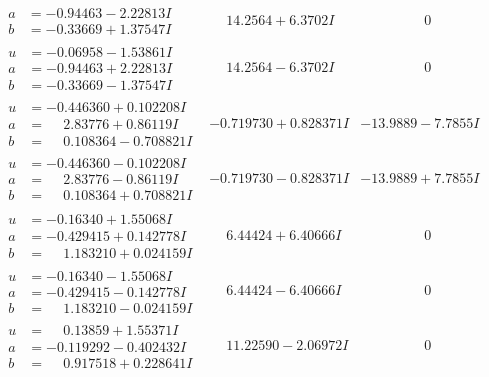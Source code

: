 \documentclass[1p]{elsarticle_modified}
\theoremstyle{definition}
\begin{document}
$$\begin{array}{c|c|c}
\begin{aligned}
a &= -0.94463 - 2.22813 I \\
b &= -0.33669 + 1.37547 I\end{aligned}
 & \phantom{-}14.2564 + 6.3702 I & \phantom{-0.000000 } 0 \\ \hline\begin{aligned}
u &= -0.06958 - 1.53861 I \\
a &= -0.94463 + 2.22813 I \\
b &= -0.33669 - 1.37547 I\end{aligned}
 & \phantom{-}14.2564 - 6.3702 I & \phantom{-0.000000 } 0 \\ \hline\begin{aligned}
u &= -0.446360 + 0.102208 I \\
a &= \phantom{-}2.83776 + 0.86119 I \\
b &= \phantom{-}0.108364 - 0.708821 I\end{aligned}
 & -0.719730 + 0.828371 I & -13.9889 - 7.7855 I \\ \hline\begin{aligned}
u &= -0.446360 - 0.102208 I \\
a &= \phantom{-}2.83776 - 0.86119 I \\
b &= \phantom{-}0.108364 + 0.708821 I\end{aligned}
 & -0.719730 - 0.828371 I & -13.9889 + 7.7855 I \\ \hline\begin{aligned}
u &= -0.16340 + 1.55068 I \\
a &= -0.429415 + 0.142778 I \\
b &= \phantom{-}1.183210 + 0.024159 I\end{aligned}
 & \phantom{-}6.44424 + 6.40666 I & \phantom{-0.000000 } 0 \\ \hline\begin{aligned}
u &= -0.16340 - 1.55068 I \\
a &= -0.429415 - 0.142778 I \\
b &= \phantom{-}1.183210 - 0.024159 I\end{aligned}
 & \phantom{-}6.44424 - 6.40666 I & \phantom{-0.000000 } 0 \\ \hline\begin{aligned}
u &= \phantom{-}0.13859 + 1.55371 I \\
a &= -0.119292 - 0.402432 I \\
b &= \phantom{-}0.917518 + 0.228641 I\end{aligned}
 & \phantom{-}11.22590 - 2.06972 I & \phantom{-0.000000 } 0 \\ \hline\begin{aligned}

\end{aligned}
\end{array}$$
\end{document}
